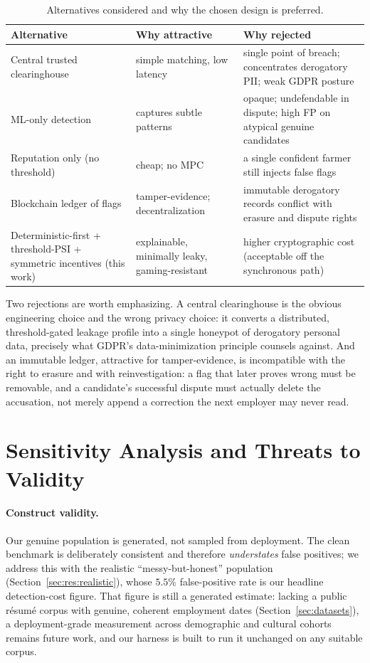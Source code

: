 \documentclass[11pt]{article}
\begin{document}
\begin{table}[t]\centering\small
\caption{Alternatives considered and why the chosen design is preferred.}\label{tab:alternatives}
\begin{tabular}{p{3.3cm}p{5.0cm}p{4.4cm}}
\toprule
Alternative & Why attractive & Why rejected\\
\midrule
Central trusted clearinghouse & simple matching, low latency & single point of breach; concentrates derogatory PII; weak GDPR posture\\
ML-only detection & captures subtle patterns & opaque; undefendable in dispute; high FP on atypical genuine candidates\\
Reputation only (no threshold) & cheap; no MPC & a single confident farmer still injects false flags\\
Blockchain ledger of flags & tamper-evidence; decentralization & immutable derogatory records conflict with erasure and dispute rights\\
\rowcolor{good} Deterministic-first + threshold-PSI + symmetric incentives (this work) & explainable, minimally leaky, gaming-resistant & higher cryptographic cost (acceptable off the synchronous path)\\
\bottomrule
\end{tabular}
\end{table}

Two rejections are worth emphasizing. A central clearinghouse is the obvious
engineering choice and the wrong privacy choice: it converts a distributed,
threshold-gated leakage profile into a single honeypot of derogatory personal
data, precisely what GDPR's data-minimization principle counsels against. And an
immutable ledger, attractive for tamper-evidence, is incompatible with the right
to erasure and with reinvestigation: a flag that later proves wrong must be
removable, and a candidate's successful dispute must actually delete the
accusation, not merely append a correction the next employer may never read.

\section{Sensitivity Analysis and Threats to Validity}\label{sec:validity}

\paragraph{Construct validity.} Our genuine population is generated, not sampled
from deployment. The clean benchmark is deliberately consistent and therefore
\emph{understates} false positives; we address this with the realistic
``messy-but-honest'' population (Section~\ref{sec:res:realistic}), whose $5.5\%$
false-positive rate is our headline detection-cost figure. That figure is still a
generated estimate: lacking a public r\'esum\'e corpus with genuine, coherent
employment dates (Section~\ref{sec:datasets}), a deployment-grade measurement
across demographic and cultural cohorts remains future work, and our harness is
built to run it unchanged on any suitable corpus.
\end{document}
